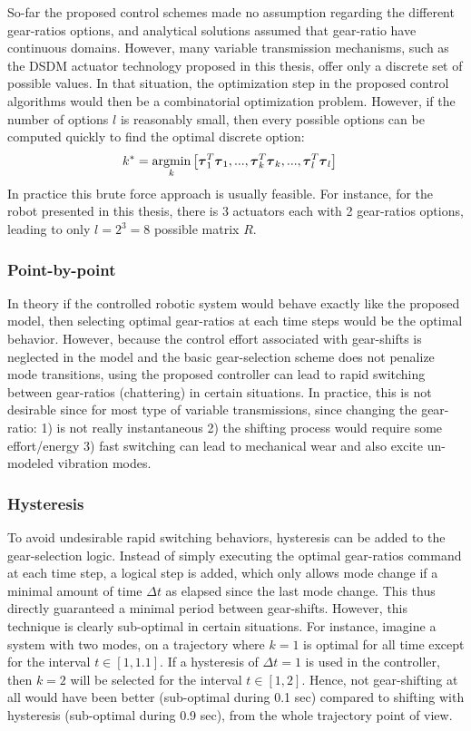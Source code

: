 So-far the proposed control schemes made no assumption regarding the different gear-ratios options, and analytical solutions assumed that gear-ratio have continuous domains. However, many variable transmission mechanisms, such as the DSDM actuator technology proposed in this thesis, offer only a discrete set of possible values. In that situation, the optimization step in the proposed control algorithms would then be a combinatorial optimization problem. However, if the number of options $l$ is reasonably small, then every possible options can be computed quickly to find the optimal discrete option:
%
\begin{align}
k^{*} &= \operatornamewithlimits{argmin}\limits_{k} \left[  \vec{\tau}_1^T\vec{\tau}_1  , ... , \vec{\tau}_k^T\vec{\tau}_k , ...  , \vec{\tau}_l^T\vec{\tau}_l \right]
\end{align}
%
In practice this brute force approach is usually feasible. For instance, for the robot presented in this thesis, there is 3 actuators each with 2 gear-ratios options, leading to only $l=2^3=8$ possible matrix $R$.

\subsubsection{Point-by-point}

In theory if the controlled robotic system would behave exactly like the proposed model, then selecting optimal gear-ratios at each time steps would be the optimal behavior. However, because the control effort associated with gear-shifts is neglected in the model and the basic gear-selection scheme does not penalize mode transitions, using the proposed controller can lead to rapid switching between gear-ratios (chattering) in certain situations. In practice, this is not desirable since for most type of variable transmissions, since changing the gear-ratio: 1) is not really instantaneous 2) the shifting process would require some effort/energy 3) fast switching can lead to mechanical wear and also excite un-modeled vibration modes. 

\subsubsection{Hysteresis}

To avoid undesirable rapid switching behaviors, hysteresis can be added to the gear-selection logic. Instead of simply executing the optimal gear-ratios command at each time step, a logical step is added, which only allows mode change if a minimal amount of time $\Delta t$ as elapsed since the last mode change. This thus directly guaranteed a minimal period between gear-shifts. However, this technique is clearly sub-optimal in certain situations. For instance, imagine a system with two modes, on a trajectory where $k=1$ is optimal for all time except for the interval $t\in[1,1.1]$. If a hysteresis of $\Delta t = 1$ is used in the controller, then $k=2$ will be selected for the interval $t\in[1,2]$. Hence, not gear-shifting at all would have been better (sub-optimal during 0.1 sec) compared to shifting with hysteresis (sub-optimal during 0.9 sec), from the whole trajectory point of view. 

